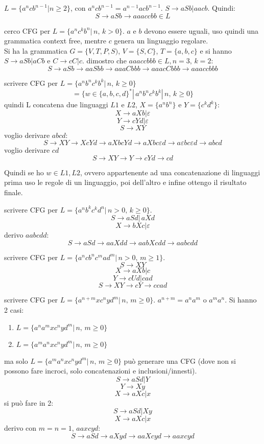 \begin{esempio}
$L=\{a^n c b^{n-1}|n\geq 2\}$, con $a^n c b^{n-1}=a^{n-1}acb^{n-1}$. $S\to aSb|aacb$. Quindi:
$$S\to aSb\to aaaccbb\in L$$
\end{esempio}
\begin{esempio}
cerco CFG per $L=\{a^n c^k b^n|\,n,\,k>0\}$. $a$ e $b$ devono essere uguali, uso quindi una grammatica context free, mentre $c$ genera un linguaggio regolare.\\
Si ha la grammatica $G=\{V,T,P,S)$, $V=\{S,C\}$, $T=\{a,b,c\}$ e si hanno $S\to aSb|aCb$ e $C\to cC|c$. dimostro che $aaaccbbb\in L, n=3,\, k=2$:
$$S\to aSb \to aaSbb\to aaaCbbb\to aaacCbbb\to aaaccbbb$$
\end{esempio}

\begin{esempio}
scrivere CFG per $L=\{a^nb^nc^kb^k|\, n,\,k\geq 0\}
$
$$=\{w\in\{a,b,c,d\}^*|\,a^nb^nc^kb^k|\, n,\,k\geq 0\}$$
quindi L concatena due linguaggi $L1$ e $L2$, $X=\{a^nb^n\}$ e $Y=\{c^kd^k\}$: 
$$X\to aXb | \varepsilon$$
$$Y\to cYd | \varepsilon$$
$$S\to XY$$
voglio derivare $abcd$:
$$S\to XY \to XcYd\to aXbcYd\to aXbc\varepsilon d\to a\varepsilon bc\varepsilon d\to abcd$$
voglio derivare $cd$
$$S\to XY\to Y\to cYd\to cd$$
\end{esempio}
Quindi se ho $w\in L1, L2$, ovvero appartenente ad una concatenazione di linguaggi prima uso le regole di un linguaggio, poi dell'altro e infine ottengo il risultato finale.\\
\begin{esempio}
scrivere CFG per $L=\{a^nb^kc^kd^n|\, n>0,\, k\geq 0\}
$.
$$S\to aSd|\, aXd$$
$$X\to bXc| \varepsilon$$
derivo $aabcdd$:
$$S\to aSd\to aaXdd\to aabXcdd\to aabcdd$$
\end{esempio}
\begin{esempio}
scrivere CFG per $L=\{a^ncb^nc^mad^m|\, n>0,\, m\geq 1\}
$.
$$S\to XY$$
$$X\to aXb|c$$
$$Y\to cUd| cad$$
$$S\to XY\to cY\to ccad$$
\end{esempio}
\begin{esempio}
scrivere CFG per $L=\{a^{n+m}xc^nyd^m|\, n,\, m\geq 0\}
$. $a^{n+m}=a^na^m \mbox{ o } a^ma^n$. Si hanno 2 casi:
\begin{enumerate}
\item $L=\{a^na^m xc^nyd^m|\, n,\, m\geq 0\}
$
\item $L=\{a^ma^n xc^nyd^m|\, n,\, m\geq 0\}
$
\end{enumerate}
ma solo  $L=\{a^ma^n xc^nyd^m|\, n,\, m\geq 0\}
$ può generare una CFG (dove non si possono fare incroci, solo concatenazioni e inclusioni/innesti). 
$$S\to aSd| Y$$
$$Y\to Xy$$
$$X\to aXc|x$$ 
si può fare in 2:
$$S\to aSd| Xy$$
$$X\to aXc|x$$ 
derivo con $m=n=1$, $aaxcyd$:
$$S\to aSd\to aXyd\to aaXcyd\to aaxcyd$$
\end{esempio}

